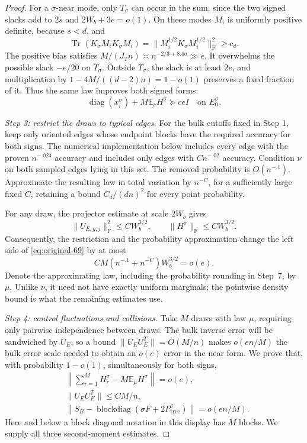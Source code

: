 \begin{proof}
For a $\sigma$-near mode, only $T_\sigma$ can occur in the sum, since the two
signed slacks add to $2s$ and $2W_b+3e=o(1)$.
On these modes $M_i$ is uniformly positive definite, because $s<d$, and
\[
 \operatorname{Tr}(K_\sigma M_iK_\sigma M_i)
 =\|M_i^{1/2}K_\sigma M_i^{1/2}\|_{\mathrm F}^2\ge c_d.
\]
The positive bias satisfies
$M/(J_Tn)\asymp n^{-2/3+8.4a}\gg e$.
It overwhelms the possible slack $-e/20$ on $T_\sigma$.
Outside $T_\sigma$, the slack is at least $2e$, and multiplication by
$1-4M/((d-2)n)=1-o(1)$ preserves a fixed fraction of it.  Thus the same
law improves both signed forms:
\begin{equation}
 \operatorname{diag}(x_i^\sigma)+M\mathbb E_\nu H^\sigma\succeq ceI
 \quad\text{on }E_0^\sigma.
 \label{eq:original-69}
\end{equation}

\par\smallskip\noindent\textit{Step 3: restrict the draws to typical edges.}\quad
For the bulk cutoffs fixed in Step 1, keep only oriented edges whose endpoint
blocks have the required accuracy for both signs.
The numerical implementation below includes every edge with the proven
$n^{-.024}$ accuracy and includes only edges with $Cn^{-.02}$ accuracy.
Condition $\nu$ on both sampled edges lying in this set.  The removed
probability is $O(n^{-.1})$.  Approximate the resulting law in total variation
by $n^{-C}$, for a sufficiently large fixed $C$, retaining a bound
$C_d/(dn)^2$ for every point probability.

For any draw, the projector estimate at scale $2W_b$ gives
\[
 \|U_{E,g,j}\|_{\mathrm F}^2\le CW_b^{3/2},\qquad
 \|H^\sigma\|_{\mathrm F}\le CW_b^{3/2}.
\]
Consequently, the restriction and the probability approximation change the
left side of \eqref{eq:original-69} by at most
\[
 CM(n^{-.1}+n^{-C})W_b^{3/2}=o(e).
\]
Denote the approximating law, including the probability rounding in Step~7,
by $\mu$.  Unlike $\nu$, it need not have exactly uniform marginals; the
pointwise density bound is what the remaining estimates use.

\par\smallskip\noindent\textit{Step 4: control fluctuations and collisions.}\quad
Take $M$ draws with law $\mu$, requiring only pairwise independence between
draws.  The bulk inverse error will be sandwiched by $U_E$, so a bound
$\|U_EU_E^T\|=O(M/n)$ makes $o(en/M)$ the bulk error scale needed to
obtain an $o(e)$ error in the near form.  We prove that, with probability
$1-o(1)$, simultaneously for both signs,
\begin{equation}
 \begin{split}
 &\left\|\sum_{r=1}^M H_r^\sigma-M\mathbb E_\mu H^\sigma\right\|=o(e),\\
 &\|U_EU_E^T\|\le CM/n,\\
 &\left\|S_B-\operatorname{blockdiag}
          (\sigma F+2P_{\mathrm{tree}}^\sigma)\right\|=o(en/M).
 \end{split}
 \label{eq:original-70}
\end{equation}
Here and below a block diagonal notation in this display has $M$ blocks.
We supply all three second-moment estimates.


\end{proof}
